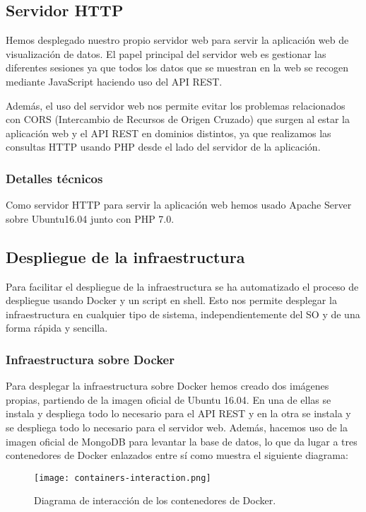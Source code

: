 \documentclass[11pt,spanish]{article}
\begin{document}
\subsection{Servidor HTTP}
Hemos desplegado nuestro propio servidor web para servir la aplicación web de visualización de datos. El papel principal del servidor web es gestionar las diferentes sesiones ya que todos los datos que se muestran en la web se recogen mediante JavaScript haciendo uso del API REST. 
\newline

Además, el uso del servidor web nos permite evitar los problemas relacionados con CORS (Intercambio de Recursos de Origen Cruzado) que surgen al estar la aplicación web y el API REST en dominios distintos, ya que realizamos las consultas HTTP usando PHP desde el lado del servidor de la aplicación.

\subsubsection{Detalles técnicos}
Como servidor HTTP para servir la aplicación web hemos usado Apache Server sobre Ubuntu16.04 junto con PHP 7.0.

\subsection{Despliegue de la infraestructura}

Para facilitar el despliegue de la infraestructura se ha automatizado el proceso de despliegue usando Docker y un script en shell. Esto nos permite desplegar la infraestructura en cualquier tipo de sistema, independientemente del SO y de una forma rápida y sencilla.

\subsubsection{Infraestructura sobre Docker}
Para desplegar la infraestructura sobre Docker hemos creado dos imágenes propias, partiendo de la imagen oficial de Ubuntu 16.04. En una de ellas se instala y despliega todo lo necesario para el API REST y en la otra se instala y se despliega todo lo necesario para el servidor web. Además, hacemos uso de la imagen oficial de MongoDB para levantar la base de datos, lo que da lugar a tres contenedores de Docker enlazados entre sí como muestra el siguiente diagrama:

\begin{figure}[H]
  \centering
  \texttt{[image: containers-interaction.png]}
  \caption{Diagrama de interacción de los contenedores de Docker.}
\end{figure}
\end{document}
